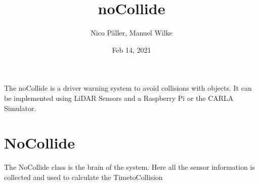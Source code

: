 \documentclass[letterpaper,10pt,english]{sphinxmanual}
\title{noCollide}
\date{Feb 14, 2021}
\author{Nico Päller, Manuel Wilke}
\begin{document}
\pagestyle{empty}
\sphinxmaketitle
\pagestyle{plain}
\sphinxtableofcontents
\pagestyle{normal}
\label{\detokenize{index::doc}}


The noCollide is a driver warning system to avoid collisions with objects. It can be implemented using LiDAR Sensors and
a Raspberry Pi or the CARLA Simulator.

\ignorespaces 

\chapter{NoCollide}
\label{\detokenize{no_collide:nocollide}}\label{\detokenize{no_collide:index-0}}\label{\detokenize{no_collide::doc}}
The NoCollide class is the brain of the system. Here all the sensor information is collected and used to calculate the
Time\sphinxhyphen{}to\sphinxhyphen{}Collision
\end{document}
